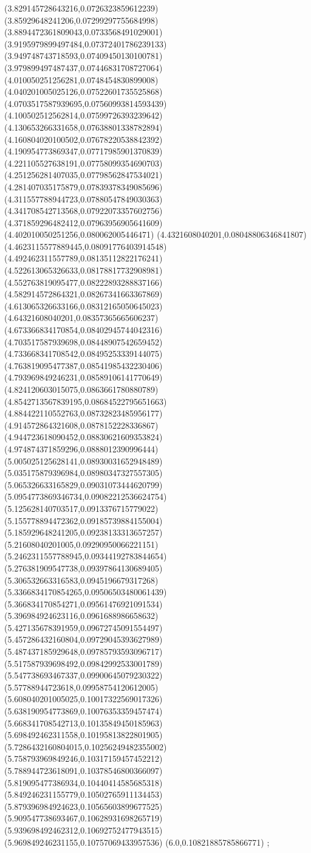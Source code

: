 {(3.829145728643216,0.0726323859612239)
(3.85929648241206,0.07299297755684998)
(3.8894472361809043,0.0733568491029001)
(3.9195979899497484,0.07372401786239133)
(3.949748743718593,0.07409450130100781)
(3.979899497487437,0.07446831708727064)
(4.010050251256281,0.0748454830899008)
(4.040201005025126,0.07522601735525868)
(4.0703517587939695,0.07560993814593439)
(4.100502512562814,0.07599726393239642)
(4.130653266331658,0.07638801338782894)
(4.160804020100502,0.07678220538842392)
(4.190954773869347,0.07717985901370839)
(4.221105527638191,0.07758099354690703)
(4.251256281407035,0.07798562847534021)
(4.281407035175879,0.07839378349085696)
(4.311557788944723,0.07880547849030363)
(4.341708542713568,0.07922073357602756)
(4.371859296482412,0.07963956905641609)
(4.402010050251256,0.080062005446471)
(4.4321608040201,0.08048806346841807)
(4.4623115577889445,0.08091776403914548)
(4.492462311557789,0.08135112822176241)
(4.522613065326633,0.08178817732908981)
(4.552763819095477,0.08222893288837166)
(4.582914572864321,0.08267341663367869)
(4.613065326633166,0.08312165050645023)
(4.64321608040201,0.08357365665606237)
(4.673366834170854,0.08402945744042316)
(4.703517587939698,0.08448907542659452)
(4.733668341708542,0.08495253339144075)
(4.763819095477387,0.08541985432230406)
(4.793969849246231,0.08589106141770649)
(4.824120603015075,0.0863661780880789)
(4.8542713567839195,0.08684522795651663)
(4.884422110552763,0.08732823485956177)
(4.914572864321608,0.0878152228336867)
(4.944723618090452,0.08830621609353824)
(4.974874371859296,0.0888012390996444)
(5.005025125628141,0.08930031652948489)
(5.035175879396984,0.08980347327557305)
(5.065326633165829,0.09031073444620799)
(5.0954773869346734,0.09082212536624754)
(5.125628140703517,0.0913376715779022)
(5.155778894472362,0.09185739884155004)
(5.185929648241205,0.09238133313657257)
(5.21608040201005,0.09290950066221151)
(5.2462311557788945,0.09344192783844654)
(5.276381909547738,0.09397864130689405)
(5.306532663316583,0.0945196679317268)
(5.3366834170854265,0.09506503480061439)
(5.366834170854271,0.09561476921091534)
(5.396984924623116,0.0961688986658632)
(5.427135678391959,0.09672745091554497)
(5.457286432160804,0.09729045393627989)
(5.487437185929648,0.09785793593096717)
(5.517587939698492,0.09842992533001789)
(5.547738693467337,0.09900645079230322)
(5.57788944723618,0.09958754120612005)
(5.608040201005025,0.10017322569017326)
(5.638190954773869,0.10076353359457474)
(5.668341708542713,0.10135849450185963)
(5.698492462311558,0.10195813822801905)
(5.7286432160804015,0.10256249482355002)
(5.758793969849246,0.10317159457452212)
(5.788944723618091,0.10378546800366097)
(5.819095477386934,0.10440414585685318)
(5.849246231155779,0.10502765911134453)
(5.879396984924623,0.10565603899677525)
(5.909547738693467,0.10628931698265719)
(5.939698492462312,0.10692752477943515)
(5.969849246231155,0.10757069433957536)
(6.0,0.10821885785866771)
};
